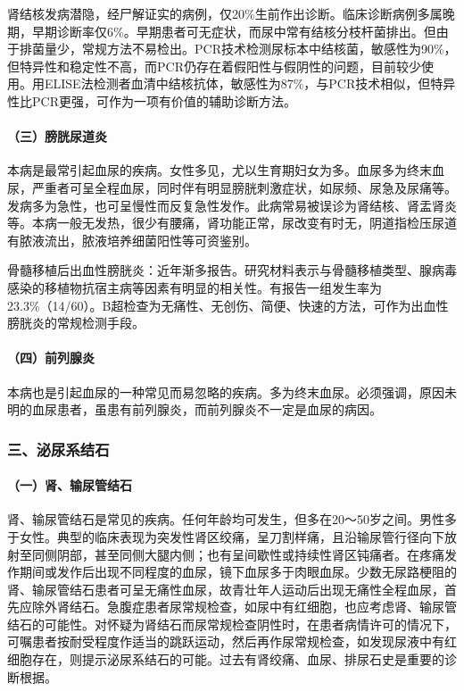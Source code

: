 肾结核发病潜隐，经尸解证实的病例，仅20\%生前作出诊断。临床诊断病例多属晚期，早期诊断率仅6\%。早期患者可无症状，而尿中常有结核分枝杆菌排出。但由于排菌量少，常规方法不易检出。PCR技术检测尿标本中结核菌，敏感性为90\%，但特异性和稳定性不高，而PCR仍存在着假阳性与假阴性的问题，目前较少使用。用ELISE法检测者血清中结核抗体，敏感性为87\%，与PCR技术相似，但特异性比PCR更强，可作为一项有价值的辅助诊断方法。

\paragraph{（三）膀胱尿道炎}

本病是最常引起血尿的疾病。女性多见，尤以生育期妇女为多。血尿多为终末血尿，严重者可呈全程血尿，同时伴有明显膀胱刺激症状，如尿频、尿急及尿痛等。发病多为急性，也可呈慢性而反复急性发作。此病常易被误诊为肾结核、肾盂肾炎等。本病一般无发热，很少有腰痛，肾功能正常，尿改变有时无，阴道指检压尿道有脓液流出，脓液培养细菌阳性等可资鉴别。

骨髓移植后出血性膀胱炎：近年渐多报告。研究材料表示与骨髓移植类型、腺病毒感染的移植物抗宿主病等因素有明显的相关性。有报告一组发生率为23.3\%（14/60）。B超检查为无痛性、无创伤、简便、快速的方法，可作为出血性膀胱炎的常规检测手段。

\paragraph{（四）前列腺炎}

本病也是引起血尿的一种常见而易忽略的疾病。多为终末血尿。必须强调，原因未明的血尿患者，虽患有前列腺炎，而前列腺炎不一定是血尿的病因。

\subsubsection{三、泌尿系结石}

\paragraph{（一）肾、输尿管结石}

肾、输尿管结石是常见的疾病。任何年龄均可发生，但多在20～50岁之间。男性多于女性。典型的临床表现为突发性肾区绞痛，呈刀割样痛，且沿输尿管行径向下放射至同侧阴部，甚至同侧大腿内侧；也有呈间歇性或持续性肾区钝痛者。在疼痛发作期间或发作后出现不同程度的血尿，镜下血尿多于肉眼血尿。少数无尿路梗阻的肾、输尿管结石患者可呈无痛性血尿，故青壮年人运动后出现无痛性全程血尿，首先应除外肾结石。急腹症患者尿常规检查，如尿中有红细胞，也应考虑肾、输尿管结石的可能性。对怀疑为肾结石而尿常规检查阴性时，在患者病情许可的情况下，可嘱患者按耐受程度作适当的跳跃运动，然后再作尿常规检查，如发现尿液中有红细胞存在，则提示泌尿系结石的可能。过去有肾绞痛、血尿、排尿石史是重要的诊断根据。

